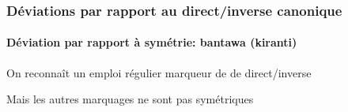 \begin{frame}
\frametitle{Déviations par rapport au direct/inverse canonique}
\framesubtitle{Déviation par rapport à symétrie: bantawa (kiranti)}
\begin{smallwideitemize}
\item On reconnaît un emploi régulier marqueur de de direct/inverse
\item Mais les autres marquages ne sont pas symétriques
\end{smallwideitemize}

\vspace*{-.6cm}
\begin{table}[H]
\caption{The Bantawa non-past affirmative transitive paradigm (\cite[145-8]{doornenbal09})}\label{tab:bantawapos}
\end{table}
\end{frame}

